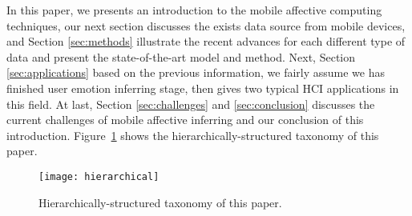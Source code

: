In this paper, we presents an introduction to the mobile affective computing techniques, our next section discusses the exists data source from mobile devices, and Section \ref{sec:methods} illustrate the recent advances for each different type of data and present the state-of-the-art model and method. Next, Section \ref{sec:applications} based on the previous information, we fairly assume we has finished user emotion inferring stage, then gives two typical HCI applications in this field. At last, Section \ref{sec:challenges} and \ref{sec:conclusion} discusses the current challenges of mobile affective inferring and our conclusion of this introduction.
Figure~\ref{fig:hierarchically} shows the hierarchically-structured taxonomy of this paper.

\begin{figure}[htb]
    \centering
    \texttt{[image: hierarchical]}
    \caption{Hierarchically-structured taxonomy of this paper.}
    \label{fig:hierarchically}
\end{figure}